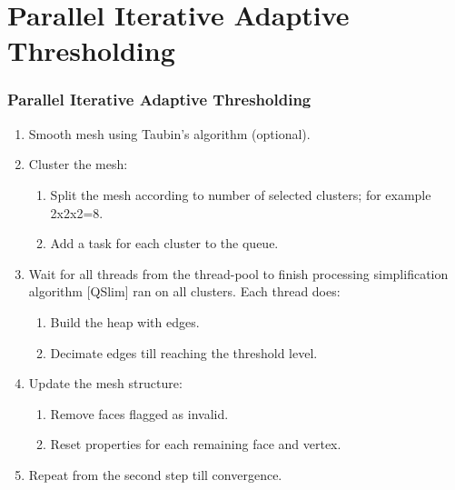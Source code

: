 \documentclass[
	10pt,
	t		%
]{beamer}
\begin{document}
\section{Parallel Iterative Adaptive Thresholding}
\begin{frame}
\frametitle{Parallel Iterative Adaptive Thresholding}
\centering
\begin{enumerate}
\color{gray}
\item Smooth mesh using Taubin's algorithm (optional).
\color{black}
\item Cluster the mesh:
\begin{enumerate}
\item Split the mesh according to number of selected clusters; for example 2x2x2=8.
\item Add a task for each cluster to the queue.
\end{enumerate}
\color{gray}
\item Wait for all threads from the thread-pool to finish processing simplification algorithm [QSlim] ran on all clusters. Each thread does:
\begin{enumerate}
\color{gray}
\item Build the heap with edges.
\item Decimate edges till reaching the threshold level.
\end{enumerate}
\item Update the mesh structure:
\begin{enumerate}
\color{gray}
\item Remove faces flagged as invalid.
\item Reset properties for each remaining face and vertex.
\end{enumerate}
\item Repeat from the second step till convergence.
\end{enumerate}
\end{frame}
\end{document}
